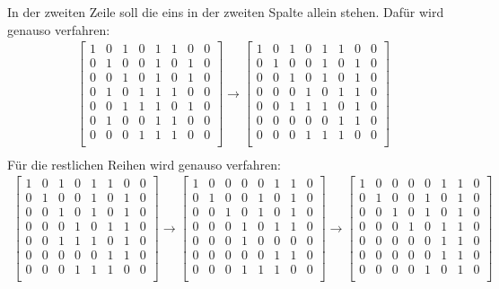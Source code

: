 \documentclass[a4paper,10pt,ngerman]{scrartcl}
\begin{document}
In der zweiten Zeile soll die eins in der zweiten Spalte allein stehen. Dafür wird genauso verfahren:
\begin{align*}
\left[\begin{array}{ccccccc|c}
1&0&1&0&1&1&0&0\\
0&1&0&0&1&0&1&0\\
0&0&1&0&1&0&1&0\\
0&1&0&1&1&1&0&0\\
0&0&1&1&1&0&1&0\\
0&1&0&0&1&1&0&0\\
0&0&0&1&1&1&0&0\\
\end{array}\right]
\rightarrow \left[\begin{array}{ccccccc|c}
1&0&1&0&1&1&0&0\\
0&1&0&0&1&0&1&0\\
0&0&1&0&1&0&1&0\\
0&0&0&1&0&1&1&0\\
0&0&1&1&1&0&1&0\\
0&0&0&0&0&1&1&0\\
0&0&0&1&1&1&0&0\\
\end{array}\right]\\
\end{align*}
Für die restlichen Reihen wird genauso verfahren:
\begin{align*}
\left[\begin{array}{ccccccc|c}
1&0&1&0&1&1&0&0\\
0&1&0&0&1&0&1&0\\
0&0&1&0&1&0&1&0\\
0&0&0&1&0&1&1&0\\
0&0&1&1&1&0&1&0\\
0&0&0&0&0&1&1&0\\
0&0&0&1&1&1&0&0\\
\end{array}\right]
\rightarrow \left[\begin{array}{ccccccc|c}
1&0&0&0&0&1&1&0\\
0&1&0&0&1&0&1&0\\
0&0&1&0&1&0&1&0\\
0&0&0&1&0&1&1&0\\
0&0&0&1&0&0&0&0\\
0&0&0&0&0&1&1&0\\
0&0&0&1&1&1&0&0\\
\end{array}\right]
\rightarrow \left[\begin{array}{ccccccc|c}
1&0&0&0&0&1&1&0\\
0&1&0&0&1&0&1&0\\
0&0&1&0&1&0&1&0\\
0&0&0&1&0&1&1&0\\
0&0&0&0&0&1&1&0\\
0&0&0&0&0&1&1&0\\
0&0&0&0&1&0&1&0\\
\end{array}\right]\\
\end{align*}
\end{document}
